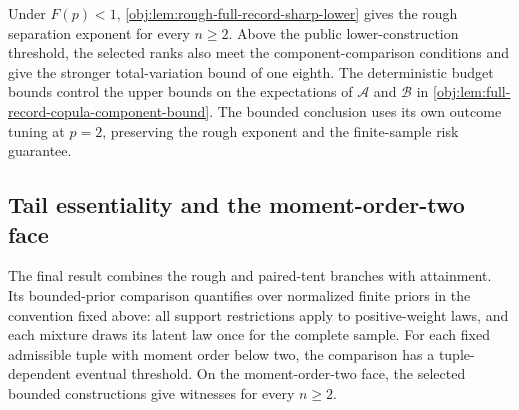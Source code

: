 \documentclass[11pt]{article}
\begin{document}
Under \(F(p)<1\), \cref{obj:lem:rough-full-record-sharp-lower} gives the rough separation exponent for every \(n\ge2\). Above the public lower-construction threshold, the selected ranks also meet the component-comparison conditions and give the stronger total-variation bound of one eighth. The deterministic budget bounds control the upper bounds on the expectations of \(\mathcal A\) and \(\mathcal B\) in \cref{obj:lem:full-record-copula-component-bound}. The bounded conclusion uses its own outcome tuning at \(p=2\), preserving the rough exponent and the finite-sample risk guarantee.

\subsection{Tail essentiality and the moment-order-two face}

The final result combines the rough and paired-tent branches with attainment. Its bounded-prior comparison quantifies over normalized finite priors in the convention fixed above: all support restrictions apply to positive-weight laws, and each mixture draws its latent law once for the complete sample. For each fixed admissible tuple with moment order below two, the comparison has a tuple-dependent eventual threshold. On the moment-order-two face, the selected bounded constructions give witnesses for every \(n\ge2\).
\end{document}
